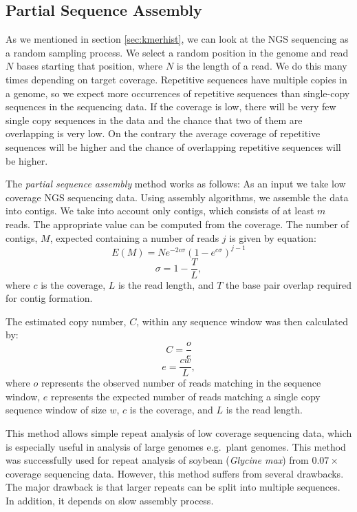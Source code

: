 
\subsection{Partial Sequence Assembly}

As we mentioned in section \ref{sec:kmerhist}, we can look at the NGS sequencing as a random sampling process. We select a random position in the genome and read $N$ bases starting that position, where $N$ is the length of a read. We do this many times depending on target coverage.
Repetitive sequences have multiple copies in a genome, so we expect more occurrences of repetitive sequences than single-copy sequences in the sequencing data. If the coverage is low, there will be very few single copy sequences in the data and the chance that two of them are overlapping is very low. On the contrary the average coverage of repetitive sequences will be higher and the chance of overlapping repetitive sequences will be higher.

The \emph{partial sequence assembly} method works as follows: As an input we take low coverage NGS sequencing data. Using assembly algorithms, we assemble the data into contigs. We take into account only contigs, which consists of at least $m$ reads. The appropriate value can be computed from the coverage. The number of contigs, $M$, expected containing a number of reads $j$ is given by equation\cite{swaminathan2007global}:
$$E(M) = Ne^{-2c\sigma}(1-e^{c\sigma})^{j-1}$$
$$\sigma = 1 - \frac{T}{L},$$
where $c$ is the coverage, $L$ is the read length, and $T$ the base pair overlap required for contig formation.

The estimated copy number, $C$, within any sequence window was then calculated by\cite{swaminathan2007global}:
$$C = \frac{o}{e}$$
$$e = \frac{cw}{L},$$
where $o$ represents the observed number of reads matching in the sequence window, $e$ represents the expected number of reads matching a single copy sequence window of size $w$, $c$ is the coverage, and $L$ is the read length.

This method allows simple repeat analysis of low coverage sequencing data, which is especially useful in analysis of large genomes e.g.\ plant genomes. This method was successfully used for repeat analysis of soybean (\textit{Glycine max}) from $0.07\times$ coverage sequencing data\cite{swaminathan2007global}.
However, this method suffers from several drawbacks. The major drawback is that larger repeats can be split into multiple sequences. In addition, it depends on slow assembly process.

